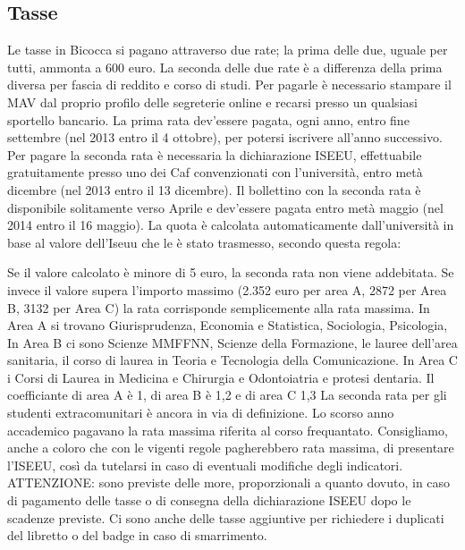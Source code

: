 \subsection{Tasse}

Le tasse in Bicocca si pagano attraverso due rate; la prima delle due, uguale per tutti, ammonta a 600 euro. La seconda delle due rate è a differenza della prima diversa per fascia di reddito e corso di studi.
Per pagarle è necessario stampare il MAV dal proprio profilo delle segreterie online e recarsi presso un qualsiasi sportello bancario. La prima rata dev'essere pagata, ogni anno, entro fine settembre (nel 2013 entro il 4 ottobre), per potersi iscrivere all'anno successivo. Per pagare la seconda rata è necessaria la dichiarazione ISEEU, effettuabile gratuitamente presso uno dei Caf convenzionati con l'università, entro metà dicembre (nel 2013 entro il 13 dicembre). 
Il bollettino con la seconda rata è disponibile solitamente verso Aprile e dev'essere pagata entro metà maggio (nel 2014 entro il 16 maggio). La quota è calcolata automaticamente dall'università in base al valore dell'Iseuu che le è stato trasmesso, secondo questa regola: 
Se il valore calcolato è minore di 5 euro, la seconda rata non viene addebitata. Se invece il valore supera l'importo massimo (2.352 euro per area A, 2872 per Area B, 3132 per Area C) la rata corrisponde semplicemente alla rata massima. In Area A si trovano Giurisprudenza, Economia e Statistica, Sociologia, Psicologia, In Area B ci sono Scienze MMFFNN, Scienze della Formazione, le lauree dell'area sanitaria, il corso di laurea in Teoria e Tecnologia della Comunicazione. In Area C i Corsi di Laurea in Medicina e Chirurgia e Odontoiatria e protesi dentaria.
Il coefficiante di area A è 1, di area B è 1,2 e di area C 1,3
La seconda rata per gli studenti extracomunitari è ancora in via di definizione. Lo scorso anno accademico pagavano la rata massima riferita al corso frequantato. Consigliamo, anche a coloro che con le vigenti regole pagherebbero rata massima, di presentare l'ISEEU, così da tutelarsi in caso di eventuali modifiche degli indicatori.
ATTENZIONE: sono previste delle more, proporzionali a quanto dovuto, in caso di pagamento delle tasse o di consegna della dichiarazione ISEEU dopo le scadenze previste. Ci sono anche delle tasse aggiuntive per richiedere i duplicati del libretto o del badge in caso di smarrimento.
 
